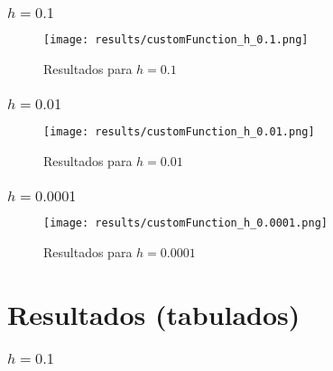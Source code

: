 \documentclass[11pt]{beamer}
\begin{document}
\begin{frame}
    \frametitle{$h=0.1$}
    \begin{figure}
        \texttt{[image: results/customFunction\_h\_0.1.png]}
        \caption{Resultados para $h=0.1$}
    \end{figure}
\end{frame}

\begin{frame}
    \frametitle{$h=0.01$}
    \begin{figure}
        \texttt{[image: results/customFunction\_h\_0.01.png]}
        \caption{Resultados para $h=0.01$}
    \end{figure}
\end{frame}

\begin{frame}
    \frametitle{$h=0.0001$}
    \begin{figure}
        \texttt{[image: results/customFunction\_h\_0.0001.png]}
        \caption{Resultados para $h=0.0001$}
    \end{figure}
\end{frame}

\section{Resultados (tabulados)}

\begin{frame}
    \frametitle{$h=0.1$}
    \begin{table}[H]
        \centering
        \caption{$h=0.1$}
    \end{table}
\end{frame}
\end{document}
